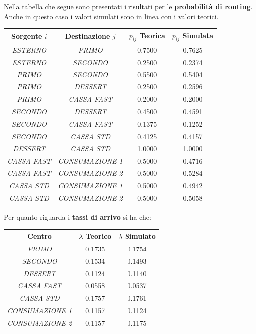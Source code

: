 \documentclass{article}
\begin{document}
Nella tabella che segue sono presentati i risultati per le \textbf{probabilità di routing}. Anche in questo caso i valori simulati sono in linea con i valori teorici.
\begin{center}
\begin{tabular}{|c|c|c|c|}
 \hline
 \textbf{Sorgente $i$} & \textbf{Destinazione $j$} & \textbf{\(p_{ij}\) Teorica} & \textbf{\(p_{ij}\) Simulata}\\
 \hline
 \textit{ESTERNO} & \textit{PRIMO}   & 0.7500 & 0.7625\\
 \hline
 \textit{ESTERNO} & \textit{SECONDO}   & 0.2500 & 0.2374\\
 \hline
 \textit{PRIMO} & \textit{SECONDO}   & 0.5500 & 0.5404\\
 \hline
 \textit{PRIMO} & \textit{DESSERT}   & 0.2500 & 0.2596\\
 \hline
 \textit{PRIMO} & \textit{CASSA FAST}   & 0.2000 & 0.2000\\
\hline
 \textit{SECONDO} & \textit{DESSERT}   & 0.4500 & 0.4591\\
 \hline
 \textit{SECONDO} & \textit{CASSA FAST}   & 0.1375 & 0.1252\\
\hline
 \textit{SECONDO} & \textit{CASSA STD}   & 0.4125 & 0.4157\\
\hline
 \textit{DESSERT} & \textit{CASSA STD}   & 1.0000 & 1.0000\\
 \hline
 \textit{CASSA FAST} & \textit{CONSUMAZIONE 1}   & 0.5000 & 0.4716\\
 \hline
 \textit{CASSA FAST} & \textit{CONSUMAZIONE 2}   & 0.5000 & 0.5284\\
 \hline
 \textit{CASSA STD} & \textit{CONSUMAZIONE 1}   & 0.5000 & 0.4942\\
 \hline
 \textit{CASSA STD} & \textit{CONSUMAZIONE 2}   & 0.5000 & 0.5058\\
 \hline
\end{tabular}
\end{center}
Per quanto riguarda i \textbf{tassi di arrivo} si ha che:
\begin{center}
\begin{tabular}{|c|c|c|}
 \hline
 \textbf{Centro} & $\lambda$ \textbf{Teorico} & $\lambda$ \textbf{Simulato}\\
 \hline
 \textit{PRIMO} & 0.1735 & 0.1754\\
 \hline
 \textit{SECONDO} & 0.1534 & 0.1493\\
 \hline
 \textit{DESSERT} & 0.1124 & 0.1140\\
 \hline
 \textit{CASSA FAST} & 0.0558 & 0.0537\\
 \hline
 \textit{CASSA STD} & 0.1757 & 0.1761\\
 \hline
 \textit{CONSUMAZIONE 1} & 0.1157 & 0.1124\\
 \hline
 \textit{CONSUMAZIONE 2} & 0.1157 & 0.1175\\
 \hline
\end{tabular}
\end{center}
\end{document}
